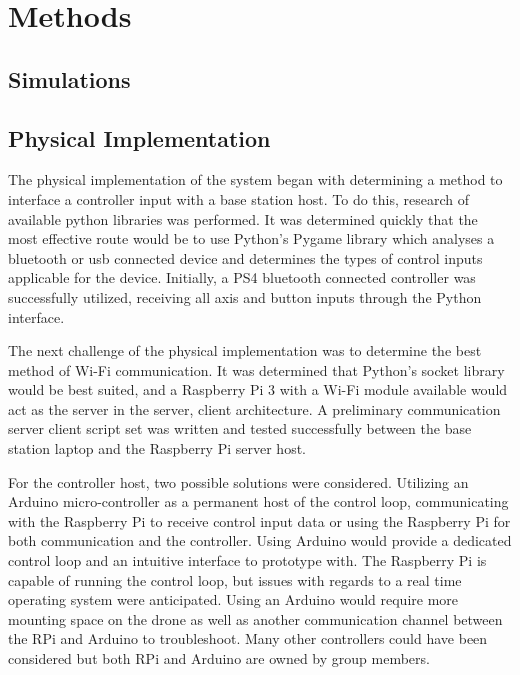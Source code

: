 
\section{Methods}


\subsection{Simulations}



\subsection{Physical Implementation}

The physical implementation of the system began with determining a method to interface a controller input with a base station host. To do this, research of available python libraries was performed. It was determined quickly that the most effective route would be to use Python's Pygame library which analyses a bluetooth or usb connected device and determines the types of control inputs applicable for the device. Initially, a PS4 bluetooth connected controller was successfully utilized, receiving all axis and button inputs through the Python interface. 

The next challenge of the physical implementation was to determine the best method of Wi-Fi communication. It was determined that Python's socket library would be best suited, and a Raspberry Pi 3 with a Wi-Fi module available would act as the server in the server, client architecture. A preliminary communication server client script set was written and tested successfully between the base station laptop and the Raspberry Pi server host. 

For the controller host, two possible solutions were considered. Utilizing an Arduino micro-controller as a permanent host of the control loop, communicating with the Raspberry Pi to receive control input data or using the Raspberry Pi for both communication and the controller. Using Arduino would provide a dedicated control loop and an intuitive interface to prototype with. The Raspberry Pi is capable of running the control loop, but issues with regards to a real time operating system were anticipated. Using an Arduino would require more mounting space on the drone as well as another communication channel between the RPi and Arduino to troubleshoot. Many other controllers could have been considered but both RPi and Arduino are owned by group members.


